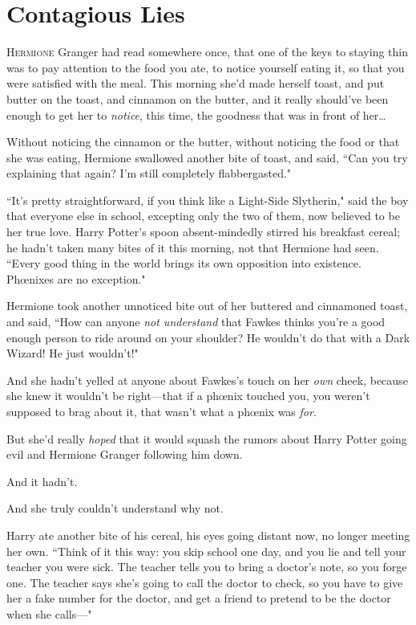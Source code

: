 \chapter{Contagious Lies}

\lettrine{H}{ermione} Granger had read somewhere once, that one of the keys to staying thin was to pay attention to the food you ate, to notice yourself eating it, so that you were satisfied with the meal. This morning she'd made herself toast, and put butter on the toast, and cinnamon on the butter, and it really should've been enough to get her to \emph{notice}, this time, the goodness that was in front of her{\ldots}

Without noticing the cinnamon or the butter, without noticing the food or that she was eating, Hermione swallowed another bite of toast, and said, ``Can you try explaining that again? I'm still completely flabbergasted."

``It's pretty straightforward, if you think like a Light-Side Slytherin," said the boy that everyone else in school, excepting only the two of them, now believed to be her true love. Harry Potter's spoon absent-mindedly stirred his breakfast cereal; he hadn't taken many bites of it this morning, not that Hermione had seen. ``Every good thing in the world brings its own opposition into existence. Phœnixes are no exception."

Hermione took another unnoticed bite out of her buttered and cinnamoned toast, and said, ``How can anyone \emph{not understand} that Fawkes thinks you're a good enough person to ride around on your shoulder? He wouldn't do that with a Dark Wizard! He just wouldn't!"

And she hadn't yelled at anyone about Fawkes's touch on her \emph{own} cheek, because she knew it wouldn't be right—that if a phœnix touched you, you weren't supposed to brag about it, that wasn't what a phœnix was \emph{for}.

But she'd really \emph{hoped} that it would squash the rumors about Harry Potter going evil and Hermione Granger following him down.

And it hadn't.

And she truly couldn't understand why not.

Harry ate another bite of his cereal, his eyes going distant now, no longer meeting her own. ``Think of it this way: you skip school one day, and you lie and tell your teacher you were sick. The teacher tells you to bring a doctor's note, so you forge one. The teacher says she's going to call the doctor to check, so you have to give her a fake number for the doctor, and get a friend to pretend to be the doctor when she calls—"

